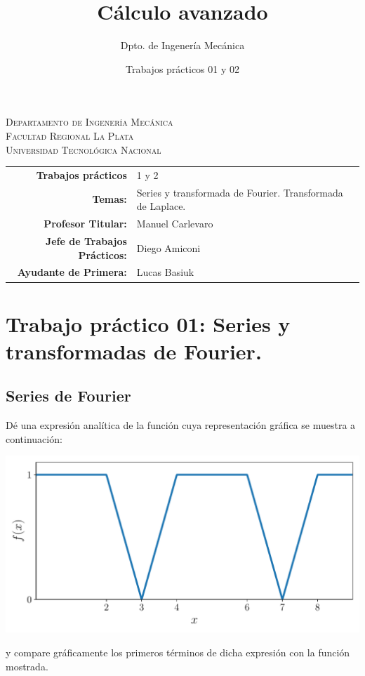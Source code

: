 \documentclass[11pt]{article}
\title{Cálculo avanzado}
\author{Dpto. de Ingenería Mecánica}
\date{Trabajos prácticos 01 y 02}
\begin{document}

\begin{center}
\end{center} 

\begin{center}
\vspace{\baselineskip}
\Large{\textsc{Departamento de Ingenería Mecánica}} \\
\textsc{Facultad Regional La Plata} \\
\textsc{Universidad Tecnológica Nacional}
\end{center}


\begin{center}
\begin{tabular}{r l}
    \textbf{Trabajos prácticos} & 1 y 2 \\
 \textbf{Temas:} & Series y transformada de Fourier. Transformada de Laplace.\\
 \textbf{Profesor Titular:} & Manuel Carlevaro \\
 \textbf{Jefe de Trabajos Prácticos:} & Diego Amiconi \\
 \textbf{Ayudante de Primera:} & Lucas Basiuk 
\end{tabular}\end{center}

\vspace{1em}

\section{Trabajo práctico 01: Series y transformadas de Fourier.}

\subsection{Series de Fourier}
Dé una expresión analítica de la función cuya representación gráfica se muestra a continuación:
\begin{center}
    \includegraphics[scale=0.6]{figs/fig-01.pdf}
\end{center}
y compare gráficamente los primeros términos de dicha expresión con la función mostrada.
\end{document}

